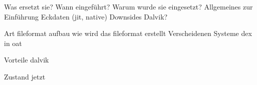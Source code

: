 Was ersetzt sie? Wann eingeführt?
Warum wurde sie eingesetzt?
Allgemeines zur Einführung
Eckdaten (jit, native)
Downsides Dalvik?

Art fileformat
aufbau
wie wird das fileformat erstellt
Verscheidenen Systeme
dex in oat

Vorteile dalvik

Zustand jetzt
